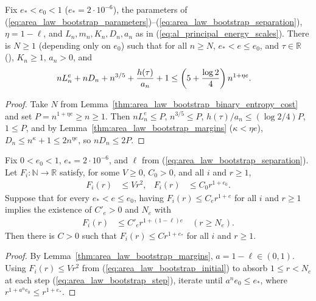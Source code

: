 \begin{lemma}
    \label{thm:area_law_bootstrap_comparison_budget}
    \leanok
    Fix $e_*<e_0<1$ ($e_*=2\cdot10^{-6}$), the parameters of
    (\ref{eq:area_law_bootstrap_parameters})--(\ref{eq:area_law_bootstrap_separation}),
    $\eta=1-\ell$, and $L_n,m_n,K_n,D_n,a_n$ as in
    (\ref{eq:al_principal_energy_scales}). There is $N\ge1$ (depending only on
    $e_0$) such that for all $n\ge N$, $e_*<e\le e_0$, and $\tau\in\mathbb R$
    (\cite[Proposition~9.5]{OpenAI2026AreaLaw}), $K_n\ge1$, $a_n>0$, and
    \begin{align}
        nL_n^e+nD_n+n^{3/5}+\frac{h(\tau)}{a_n}+1
         & \le\left(5+\frac{\log2}{4}\right)n^{1+\eta e}. \notag
    \end{align}
\end{lemma}

\begin{proof}\leanok
    Take $N$ from Lemma~\ref{thm:area_law_bootstrap_binary_entropy_cost} and
    set $P=n^{1+\eta e}\ge n\ge1$. Then $nL_n^e\le P$, $n^{3/5}\le P$,
    $h(\tau)/a_n\le(\log2/4)P$, $1\le P$, and by
    Lemma~\ref{thm:area_law_bootstrap_margins} ($\kappa<\eta e$),
    $D_n\le n^\kappa+1\le2n^{\eta e}$, so $nD_n\le2P$.
\end{proof}

\begin{lemma}
    \label{thm:area_law_finite_exponent_improvement}
    \leanok
    Fix $0<e_0<1$, $e_*=2\cdot10^{-6}$, and $\ell$ from
    (\ref{eq:area_law_bootstrap_separation}). Let $F_i:\mathbb N\to\mathbb R$
    satisfy, for some $V\ge0$, $C_0>0$, and all $i$ and $r\ge1$,
    \begin{align}
        F_i(r) & \le Vr^2, & F_i(r) & \le C_0r^{1+e_0}.
        \label{eq:area_law_bootstrap_initial}
    \end{align}
    Suppose that for every $e_*<e\le e_0$, having $F_i(r)\le C_er^{1+e}$ for all
    $i$ and $r\ge1$ implies the existence of $C'_e>0$ and $N_e$ with
    \begin{align}
        F_i(r) & \le C'_er^{1+(1-\ell)e}\quad(r\ge N_e).
        \label{eq:area_law_bootstrap_step}
    \end{align}
    Then there is $C>0$ such that $F_i(r)\le Cr^{1+e_*}$ for all $i$ and $r\ge1$.
\end{lemma}
\begin{proof}\leanok
    By Lemma~\ref{thm:area_law_bootstrap_margins}, $a=1-\ell\in(0,1)$.
    Using $F_i(r)\le Vr^2$ from (\ref{eq:area_law_bootstrap_initial}) to absorb
    $1\le r<N_e$ at each step (\ref{eq:area_law_bootstrap_step}), iterate until
    $a^ne_0\le e_*$, where $r^{1+a^ne_0}\le r^{1+e_*}$.
\end{proof}

